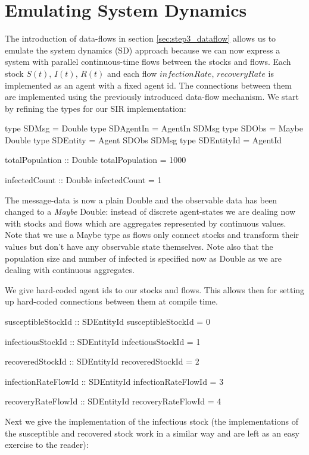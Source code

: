 \section{Emulating System Dynamics}
The introduction of data-flows in section \ref{sec:step3_dataflow} allows us to emulate the system dynamics (SD) approach because we can now express a system with parallel continuous-time flows between the stocks and flows. Each stock $S(t)$, $I(t)$, $R(t)$ and each flow $infectionRate$, $recoveryRate$ is implemented as an agent with a fixed agent id. The connections between them are implemented using the previously introduced data-flow mechanism. We start by refining the types for our SIR implementation:

\begin{HaskellCode}
type SDMsg      = Double
type SDAgentIn  = AgentIn SDMsg
type SDObs      = Maybe Double
type SDEntity   = Agent SDObs SDMsg
type SDEntityId = AgentId

totalPopulation :: Double
totalPopulation = 1000

infectedCount :: Double
infectedCount = 1
\end{HaskellCode}

The message-data is now a plain Double and the observable data has been changed to a \textit{Maybe} Double: instead of discrete agent-states we are dealing now with stocks and flows which are aggregates represented by continuous values. Note that we use a Maybe type as flows only connect stocks and transform their values but don't have any observable state themselves. Note also that the population size and number of infected is specified now as Double as we are dealing with continuous aggregates.

We give hard-coded agent ids to our stocks and flows. This allows then for setting up hard-coded connections between them at compile time.
\begin{HaskellCode}
susceptibleStockId :: SDEntityId
susceptibleStockId = 0

infectiousStockId :: SDEntityId
infectiousStockId = 1

recoveredStockId :: SDEntityId
recoveredStockId = 2

infectionRateFlowId :: SDEntityId
infectionRateFlowId = 3

recoveryRateFlowId :: SDEntityId
recoveryRateFlowId = 4
\end{HaskellCode}

Next we give the implementation of the infectious stock (the implementations of the susceptible and recovered stock work in a similar way and are left as an easy exercise to the reader):

